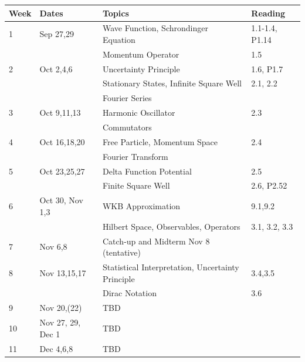 \documentclass[12pt]{article}
\begin{document}
\noindent
\begin{tabular}{llll}
\textbf{Week} & \textbf{Dates} & \textbf{Topics} & \textbf{Reading} \\
\hline
1  & Sep 27,29         & Wave Function, Schrondinger Equation & 1.1-1.4, P1.14 \\
   &                   & Momentum Operator  & 1.5 \\
\hline
2  & Oct 2,4,6         & Uncertainty Principle & 1.6, P1.7 \\
   &                   & Stationary States, Infinite Square Well & 2.1, 2.2 \\
   &                   & Fourier Series   & \\
\hline
3  & Oct 9,11,13       & Harmonic Oscillator & 2.3 \\
   &                   & Commutators         &   \\
\hline
4  & Oct 16,18,20      & Free Particle, Momentum Space & 2.4 \\
   &                   & Fourier Transform  &  \\
\hline
5  & Oct 23,25,27      & Delta Function Potential & 2.5 \\
   &                   & Finite Square Well & 2.6, P2.52\\
\hline
6  & Oct 30, Nov 1,3   & WKB Approximation & 9.1,9.2 \\
   &                   & Hilbert Space, Observables, Operators & 3.1, 3.2, 3.3\\
\hline
7  & Nov 6,8           & Catch-up and Midterm Nov 8 (tentative) \\
\hline
8  & Nov 13,15,17      & Statistical Interpretation, Uncertainty Principle & 3.4,3.5 \\ 
   &                   & Dirac Notation & 3.6 \\
\hline
9  & Nov 20,(22)       & TBD \\
\hline
10  & Nov 27, 29, Dec 1 & TBD \\
\hline
11 & Dec 4,6,8         & TBD \\
\hline
\end{tabular}\\ \vskip 1cm
\end{document}

